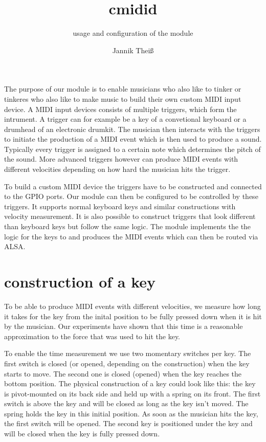 \documentclass[paper=a4,fontsize=11pt,twocolumn,pagesize,bibtotoc]{scrartcl}
\title{cmidid}
\subtitle{usage and configuration of the module}
\author{Jannik Theiß}
\begin{document}
\maketitle

The purpose of our module is to enable musicians who also like to tinker or tinkeres who also like to make music to build their own custom MIDI input device. A MIDI input devices consists of multiple triggers, which form the intrument. A trigger can for example be a key of a convetional keyboard or a drumhead of an electronic drumkit. The musician then interacts with the triggers to initiate the production of a MIDI event which is then used to produce a sound. Typically every trigger is assigned to a certain note which determines the pitch of the sound. More advanced triggers however can produce MIDI events with different velocities depending on how hard the musician hits the trigger.

To build a custom MIDI device the triggers have to be constructed and connected to the GPIO ports. Our module can then be configured to be controlled by these triggers. It supports normal keyboard keys and similar constructions with velocity measurement. It is also possible to construct triggers that look different than keyboard keys but follow the same logic. The module implements the the logic for the keys to and produces the MIDI events which can then be routed via ALSA.

\section{construction of a key}
To be able to produce MIDI events with different velocities, we measure how long it takes for the key from the inital position to be fully pressed down when it is hit by the musician. Our experiments have shown that this time is a reasonable approximation to the force that was used to hit the key.

To enable the time measurement we use two momentary switches per key. The first switch is closed (or opened, depending on the construction) when the key starts to move. The second one is closed (opened) when the key reaches the bottom position. The physical construction of a key could look like this: the key is pivot-mounted on its back side and held up with a spring on its front. The first switch is above the key and will be closed as long as the key isn't moved. The spring holds the key in this initial position. As soon as the musician hits the key, the first switch will be opened. The second key is positioned under the key and will be closed when the key is fully pressed down.
\end{document}
